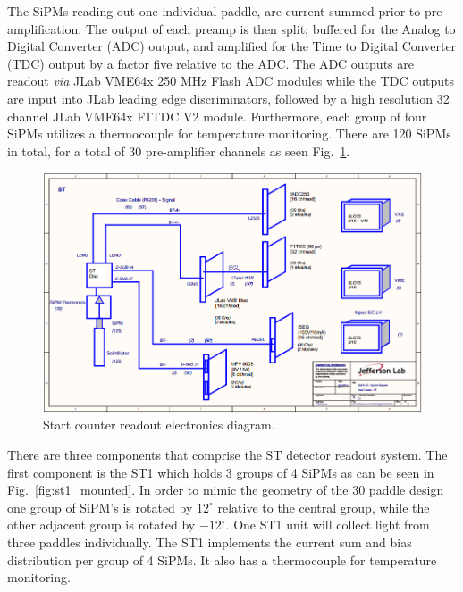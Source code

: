 The SiPMs reading out one individual paddle, are current summed prior to pre-amplification.  The output of each preamp is then split; buffered for the Analog to Digital Converter (ADC) output, and amplified for the Time to Digital Converter (TDC) output by a factor five relative to the ADC.  The ADC outputs are readout \emph{via} JLab VME64x 250 MHz Flash ADC modules while the TDC outputs are input into JLab leading edge discriminators, followed by a high resolution 32 channel JLab VME64x F1TDC V2 module.  Furthermore, each group of four SiPMs utilizes a thermocouple for temperature monitoring. There are 120 SiPMs in total, for a total of 30 pre-amplifier channels as seen Fig.~\ref{fig:Start Counter Electronics}.
\begin{figure}[!htb]
	\centering
	\includegraphics[width=1.0\columnwidth]{design/figs/ST_Electronics}
	\caption[Start counter readout electronics diagram.]{Start counter readout electronics diagram.}
	\label{fig:Start Counter Electronics}
\end{figure}

There are three components that comprise the ST detector readout system.  The first component is the ST1 which holds 3 groups of 4 SiPMs as can be seen in Fig.~\ref{fig:st1_mounted}.  In order to mimic the geometry of the 30 paddle design one group of SiPM's is rotated by $12^{\circ}$ relative to the central group, while the other adjacent group is rotated by $-12^{\circ}$.  One ST1 unit will collect light from three paddles individually.  The ST1 implements the current sum and bias distribution per group of 4 SiPMs.  It also has a thermocouple for temperature monitoring.  

